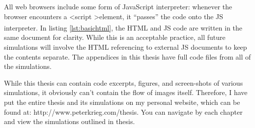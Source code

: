 All web browsers include some form of JavaScript interpreter: whenever the browser encounters a \textless script \textgreater element, it     ``passes''  the code onto the JS interpreter.\textsuperscript{\cite{jsdefinitive}}  In listing \ref{lst:basichtml}, the HTML and JS code are written in the same document for clarity.  While this is an acceptable practice, all future simulations will involve the HTML referencing to external JS documents to keep the contents separate.  The appendices in this thesis have full code files from all of the simulations.  

While this thesis can contain code excerpts, figures, and screen-shots of various simulations, it obviously can't contain the flow of images itself.  Therefore, I have put the entire thesis and its simulations on my personal website, which can be found at:  http://www.peterkrieg.com/thesis.  You can navigate by each chapter and view the simulations outlined in thesis. 




